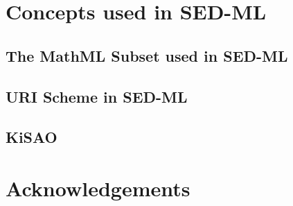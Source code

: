 \documentclass[11pt]{article}
\begin{document}

\tableofcontents
\newpage


  

  
  \section{Concepts used in SED-ML}

  \subsection{The MathML Subset used in SED-ML}
  

  \subsection{URI Scheme in SED-ML}  
  
  
  \subsection{KiSAO}
  

  

  


  

\section*{Acknowledgements}

\end{document}
